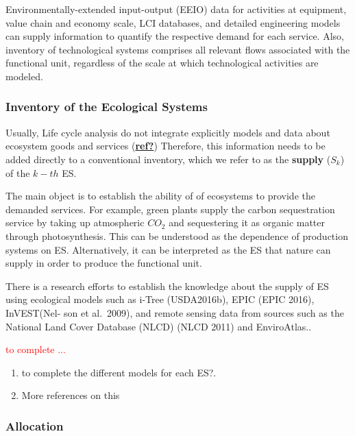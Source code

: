 \documentclass[
  14pt,
]{extarticle}
\providecommand{\tightlist}{%
  \setlength{\itemsep}{0pt}\setlength{\parskip}{0pt}}
\def\tightlist{}
\begin{document}
Environmentally-extended input-output (EEIO) data for activities at equipment, value chain and economy scale, LCI databases, and detailed engineering models can supply information to quantify the respective demand for each service.
Also, inventory of technological systems comprises all relevant flows associated with the functional unit, regardless of the scale at which technological activities are modeled.

\hypertarget{inventory-of-the-ecological-systems}{%
\subsubsection{Inventory of the Ecological Systems}\label{inventory-of-the-ecological-systems}}

Usually, Life cycle analysis do not integrate explicitly models and data about ecosystem goods and services (\protect\hyperlink{ref-ref}{\textbf{ref?}})
Therefore, this information needs to be added directly to a conventional inventory, which we refer to as the \textbf{supply} (\(S_{k}\)) of the \(k-th\) ES.

The main object is to establish the ability of of ecosystems to provide the demanded services.
For example, green plants supply the carbon sequestration service by taking up atmospheric \(CO_{2}\) and sequestering it as organic matter through photosynthesis.
This can be understood as the dependence of production systems on ES.
Alternatively, it can be interpreted as the ES that nature can supply in order to produce the functional unit.

There is a research efforts to establish the knowledge about the supply of ES using ecological models such as
i-Tree (USDA2016b), EPIC (EPIC 2016), InVEST(Nel- son et al.~2009), and remote sensing data from sources such as the National Land Cover Database (NLCD) (NLCD 2011) and EnviroAtlas..

\textcolor{red}{to complete ... }

\begin{enumerate}
\def\labelenumi{\arabic{enumi}.}
\tightlist
\item
  to complete the different models for each ES?.
\item
  More references on this
\end{enumerate}

\hypertarget{allocation}{%
\subsubsection{Allocation}\label{allocation}}
\end{document}
